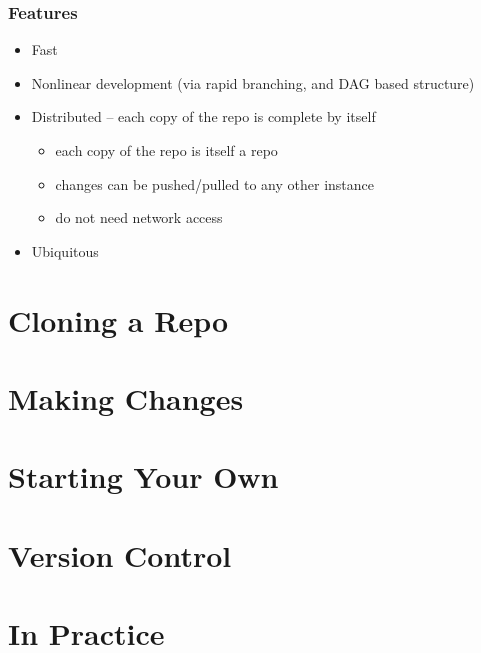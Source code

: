 \documentclass{beamer}
\begin{document}
\begin{frame}
    \frametitle{Features}
    \begin{itemize}
        \item Fast
        \item Nonlinear development (via rapid branching, and DAG based structure)
        \item Distributed -- each copy of the repo is complete by itself
            \begin{itemize}
                \item each copy of the repo is itself a repo
                \item changes can be pushed/pulled to any other instance
                \item do not need network access
            \end{itemize}
        \item Ubiquitous
    \end{itemize}
\end{frame}




\section{Cloning a Repo}

\section{Making Changes}

\section{Starting Your Own}

\section{Version Control}

\section{In Practice}
\end{document}
